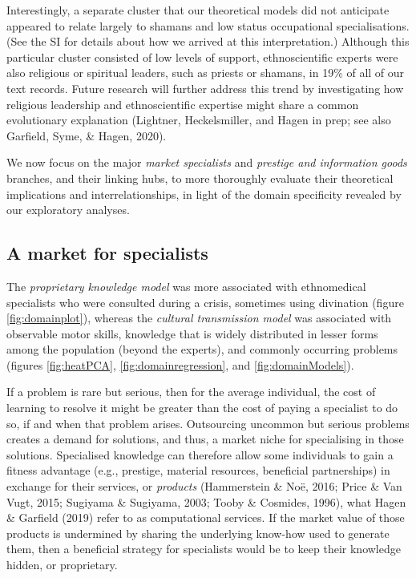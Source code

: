 \documentclass[
  11pt,
]{article}
\begin{document}
Interestingly, a separate cluster that our theoretical models did not anticipate appeared to relate largely to shamans and low status occupational specialisations. (See the SI for details about how we arrived at this interpretation.) Although this particular cluster consisted of low levels of support, ethnoscientific experts were also religious or spiritual leaders, such as priests or shamans, in 19\% of all of our text records. Future research will further address this trend by investigating how religious leadership and ethnoscientific expertise might share a common evolutionary explanation (Lightner, Heckelsmiller, and Hagen in prep; see also Garfield, Syme, \& Hagen, 2020).

We now focus on the major \emph{market specialists} and \emph{prestige and information goods} branches, and their linking hubs, to more thoroughly evaluate their theoretical implications and interrelationships, in light of the domain specificity revealed by our exploratory analyses.

\hypertarget{a-market-for-specialists}{%
\subsection{A market for specialists}\label{a-market-for-specialists}}

The \emph{proprietary knowledge model} was more associated with ethnomedical specialists who were consulted during a crisis, sometimes using divination (figure \ref{fig:domainplot}), whereas the \emph{cultural transmission model} was associated with observable motor skills, knowledge that is widely distributed in lesser forms among the population (beyond the experts), and commonly occurring problems (figures \ref{fig:heatPCA}, \ref{fig:domainregression}, and \ref{fig:domainModels}).

If a problem is rare but serious, then for the average individual, the cost of learning to resolve it might be greater than the cost of paying a specialist to do so, if and when that problem arises. Outsourcing uncommon but serious problems creates a demand for solutions, and thus, a market niche for specialising in those solutions. Specialised knowledge can therefore allow some individuals to gain a fitness advantage (e.g., prestige, material resources, beneficial partnerships) in exchange for their services, or \emph{products} (Hammerstein \& Noë, 2016; Price \& Van Vugt, 2015; Sugiyama \& Sugiyama, 2003; Tooby \& Cosmides, 1996), what Hagen \& Garfield (2019) refer to as computational services. If the market value of those products is undermined by sharing the underlying know-how used to generate them, then a beneficial strategy for specialists would be to keep their knowledge hidden, or proprietary.
\end{document}
